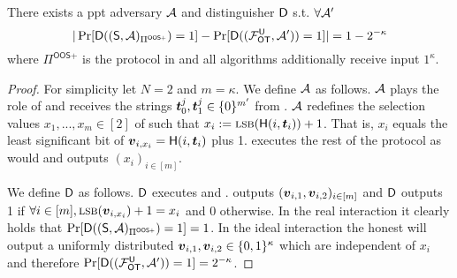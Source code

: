 \label{proof:Attack_Selection}
\begin{lemma} \label{lem:malRec2}
	There exists a ppt adversary $\Adv$ and distinguisher $\D$ s.t.  $\forall\Adv'$ 
	$$
	|\Pr[\D((\send, \Adv)_{\Pi^{\textsf{OOS+}}})=1]-\Pr[\D((\OOT^{\U}, \Adv'))=1]|=1-2^{-\kappa}
	$$
	where $\Pi^{\textsf{OOS+}}$ is the protocol in  and all algorithms additionally receive input $1^\kappa$. 
\end{lemma}
\begin{proof}
	For simplicity let $N=2$ and $m=\kappa$. We define $\Adv$ as follows. $\Adv$ plays the role of \rec and receives the strings $\tt_0^j,\tt_1^j\in \{0\}^{m'}$ from \OOT. $\Adv$ redefines the selection values $x_1,...,x_m\in[2]$ of \rec such that $x_i:=\textsc{lsb}(\H(i, \tt_i))+1$. That is, $x_i$ equals the least significant bit of $\vv_{i,x_i}=\H(i, \tt_i)$ plus 1. \Adv executes the rest of the protocol as \rec would and outputs $(x_i)_{i\in [m]}$.
	
	We define $\D$ as follows. $\D$ executes \send and \Adv. \send outputs $(\vv_{i,1},\vv_{i,2})_{i\in[m]}$ and $\D$ outputs 1 if $\forall i\in[m], \textsc{lsb}(\vv_{i,x_i})+1=x_i$ and 0 otherwise. In the real interaction it clearly holds that $\Pr[\D((\send, \Adv)_{\Pi^{\textsf{OOS+}}})=1]=1$. In the ideal interaction the honest \send will output a uniformly distributed $\vv_{i,1},\vv_{i,2}\in\{0,1\}^\kappa$ which are independent of $x_i$ and therefore $\Pr[\D((\OOT^{\U}, \Adv'))=1]=2^{-\kappa}$.
	\pe
\end{proof}
